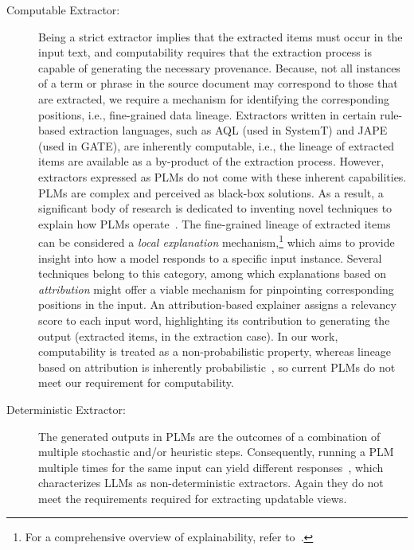\begin{description}
    
\item [Computable Extractor:] Being a strict extractor implies that the extracted items must occur in the input text, and computability requires that the extraction process is capable of generating the necessary provenance. Because, not all instances of a term or phrase in the source document may correspond to those that are extracted, we require a mechanism for identifying the corresponding positions, i.e., fine-grained data lineage. Extractors written in certain rule-based extraction languages, such as AQL (used in SystemT) and JAPE (used in GATE),  are inherently computable, i.e., the lineage of extracted items are available as a by-product of the extraction process. However, extractors expressed as PLMs do not come with these inherent capabilities. PLMs are  complex and   perceived as black-box solutions. As a result, a significant body of research is dedicated to inventing novel techniques to explain how PLMs operate~\cite{DBLP:journals/corr/abs-2309-01029}. The fine-grained lineage of extracted items can be considered a \textit{local explanation} mechanism,\footnote{For a comprehensive overview of explainability,  refer to~\cite{DBLP:journals/corr/abs-2309-01029}.} which aims to provide insight into how a model responds to a specific input instance. Several techniques belong to this category, among which explanations based on \textit{attribution} might offer a viable mechanism for pinpointing  corresponding positions in the input. An attribution-based explainer assigns a relevancy score to each input word, highlighting its contribution to generating the output (extracted items, in the extraction case). In our work,  computability is treated as a non-probabilistic property, whereas lineage based on attribution is inherently probabilistic~\cite{DBLP:journals/corr/abs-2305-06311}, so current PLMs do not meet our requirement for computability.

\item [Deterministic Extractor:] The generated outputs in PLMs are the outcomes of a combination of multiple stochastic and/or heuristic steps. Consequently, running a PLM multiple times for the same input can yield different responses~\cite{DBLP:journals/corr/abs-2307-15343,GPTRep}, which characterizes LLMs as non-deterministic extractors. Again they do not meet the requirements required for extracting updatable views.  

\end{description}





